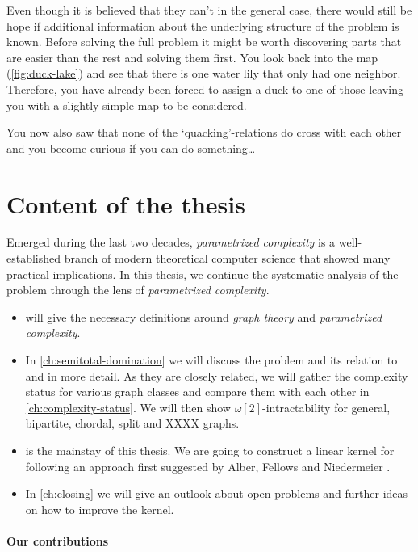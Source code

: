 Even though it is believed that they can't in the general case, there would still be hope if additional information about the underlying structure of the problem is known. 
Before solving the full problem it might be worth discovering parts that are easier than the rest and solving them first. You look back into the map (\cref{fig:duck-lake}) and see that there is one water lily that only had one neighbor.
Therefore, you have already been forced to assign a duck to one of those leaving you with a slightly simple map to be considered.

You now also saw that none of the `quacking'-relations do cross with each other and you become curious if you can do something\ldots

\section{Content of the thesis}

Emerged during the last two decades, \textit{parametrized complexity} is a well-established branch of modern theoretical computer science that showed many practical implications. 
In this thesis, we continue the systematic analysis of the \sdom problem through the lens of \textit{parametrized complexity}. 

\begin{itemize}
    \item {} will give the necessary definitions around \textit{graph theory} and \textit{parametrized complexity}.
    \item In \cref{ch:semitotal-domination} we will discuss the \sdom problem and its relation to \dom and \tdom in more detail. As they are closely related, we will gather the complexity status for various graph classes and compare them with each other in \cref{ch:complexity-status}. We will then show $\omega[2]$-intractability for general, bipartite, chordal, split and XXXX graphs.
    \item {} is the mainstay of this thesis. We are going to construct a linear kernel for \psdom following an approach first suggested by Alber, Fellows and Niedermeier \cite{Alber2004}. 
    \item In \cref{ch:closing} we will give an outlook about open problems and further ideas on how to improve the kernel.

\end{itemize}

\paragraph{Our contributions}


